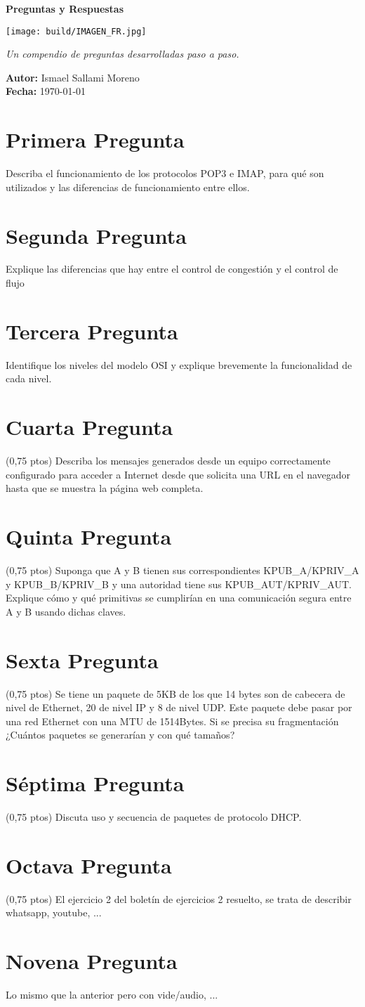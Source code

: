 \documentclass[12pt]{article}
\newcommand{\makecover}{
    \begin{titlepage}
        \centering
        {\Huge\bfseries\sffamily\color{blue!70!black} Preguntas y Respuestas}\par
        \vspace{2cm}
        \texttt{[image: build/IMAGEN\_FR.jpg]}\par
        \vspace{2cm}
        \large \textit{Un compendio de preguntas desarrolladas paso a paso.}\par
        \vfill
        \textbf{Autor:} Ismael Sallami Moreno\\
        \textbf{Fecha:} \today
        \vspace{1cm}
    \end{titlepage}
}
\begin{document}
\makecover

\tableofcontents
\newpage

\section{Primera Pregunta}
Describa el funcionamiento de los protocolos POP3 e IMAP, para qué son utilizados y las
diferencias de funcionamiento entre ellos.

\section{Segunda Pregunta}
Explique las diferencias que hay entre el control de congestión y el control de flujo

\section{Tercera Pregunta}
Identifique los niveles del modelo OSI y explique brevemente la funcionalidad de cada
nivel.

\section{Cuarta Pregunta}
(0,75 ptos) Describa los mensajes generados desde un equipo correctamente configurado para acceder
a Internet desde que solicita una URL en el navegador hasta que se muestra la página web completa.

\section{Quinta Pregunta}
(0,75 ptos) Suponga que A y B tienen sus correspondientes KPUB\_A/KPRIV\_A y KPUB\_B/KPRIV\_B y una
autoridad tiene sus KPUB\_AUT/KPRIV\_AUT. Explique cómo y qué primitivas se cumplirían en una
comunicación segura entre A y B usando dichas claves.

\section{Sexta Pregunta}
(0,75 ptos) Se tiene un paquete de 5KB de los que 14 bytes son de cabecera de nivel de Ethernet, 20
de nivel IP y 8 de nivel UDP. Este paquete debe pasar por una red Ethernet con una MTU de
1514Bytes. Si se precisa su fragmentación ¿Cuántos paquetes se generarían y con qué tamaños?

\section{Séptima Pregunta}
(0,75 ptos) Discuta uso y secuencia de paquetes de protocolo DHCP.

\section{Octava Pregunta}
(0,75 ptos) El ejercicio 2 del boletín de ejercicios 2 resuelto, se trata de describir whatsapp, youtube, ...

\section{Novena Pregunta}
Lo mismo que la anterior pero con vide/audio, ...
\end{document}
